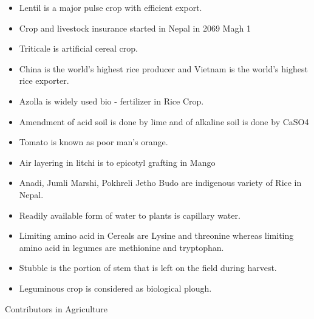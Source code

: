 \documentclass[
  openany]{book}
\begin{document}
\begin{itemize}
\item
  Lentil is a major pulse crop with efficient export.
\item
  Crop and livestock insurance started in Nepal in 2069 Magh 1
\item
  Triticale is artificial cereal crop.
\item
  China is the world's highest rice producer and Vietnam is the world's highest rice exporter.
\item
  Azolla is widely used bio - fertilizer in Rice Crop.
\item
  Amendment of acid soil is done by lime and of alkaline soil is done by CaSO4
\item
  Tomato is known as poor man's orange.
\item
  Air layering in litchi is to epicotyl grafting in Mango
\item
  Anadi, Jumli Marshi, Pokhreli Jetho Budo are indigenous variety of Rice in Nepal.
\item
  Readily available form of water to plants is capillary water.
\item
  Limiting amino acid in Cereals are Lysine and threonine whereas limiting amino acid in legumes are methionine and tryptophan.
\item
  Stubble is the portion of stem that is left on the field during harvest.
\item
  Leguminous crop is considered as biological plough.
\end{itemize}

Contributors in Agriculture
\end{document}
